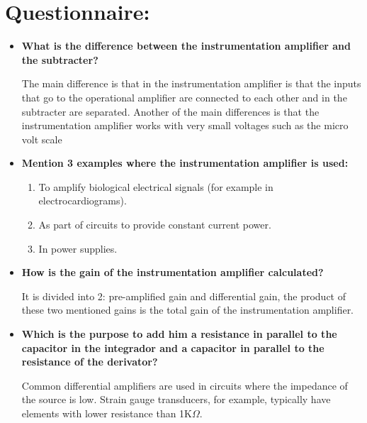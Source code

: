 \section{Questionnaire:}

\begin{itemize} 
\item {\bfseries What is the difference between the instrumentation amplifier and the subtracter?} \hfill \break

The main difference is that in the instrumentation amplifier is that the inputs that go to the operational amplifier are connected to each other and in the subtracter are separated. Another of the main differences is that the instrumentation amplifier works with very small voltages such as the micro volt scale \hfill \break

\item {\bfseries Mention 3 examples where the instrumentation amplifier is used:} 

\begin{enumerate}
\item To amplify biological electrical signals (for example in electrocardiograms).
\item As part of circuits to provide constant current power.
\item In power supplies.
\end{enumerate}

\item {\bfseries How is the gain of the instrumentation amplifier calculated?} \hfill \break

It is divided into 2: pre-amplified gain and differential gain, the product of these two mentioned gains is the total gain of the instrumentation amplifier. \hfill \break

\item {\bfseries Which is the purpose to add him a resistance in parallel to the capacitor in the integrador and a capacitor in parallel to the resistance of the derivator?} \hfill \break

Common differential amplifiers are used in circuits where the impedance of the source is low. Strain gauge transducers, for example, typically have elements with lower resistance than 1K$\Omega$.
\end{itemize}

\pagebreak